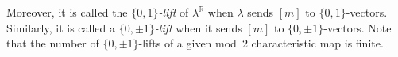 \documentclass[11pt]{amsart}
\theoremstyle{plain}
\numberwithin{equation}{section}
\theoremstyle{definition}
\newcommand{\R}{\mathbb{R}}
\newcommand{\Z}{\mathbb{Z}}
\begin{document}
\begin{center}
\end{center}


Moreover, it is called the \emph{$\{0,1\}$-lift} of $\lambda^\R$ when $\lambda$ sends $[m]$ to $\{0,1\}$-vectors.
Similarly, it is called a \emph{$\{0,\pm 1\}$-lift} when it sends $[m]$ to $\{0,\pm 1\}$-vectors.
Note that the number of $\{0,\pm1 \}$-lifts of a given mod~$2$ characteristic map is finite.
\end{document}
